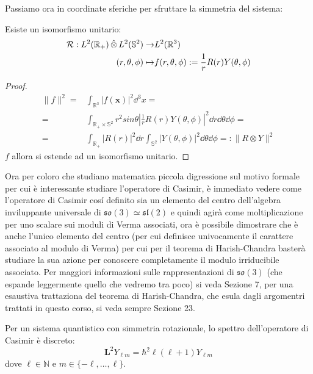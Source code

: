 Passiamo ora in coordinate sferiche per sfruttare la simmetria del sistema:
\begin{lemma}
    Esiste un isomorfismo unitario: 
\begin{align*}
\mathcal{R} :   L^2(\mathbb{R}_+) \operatorname{\hat{\otimes}} L^2(\mathbb{S}^2) \to& L^2(\mathbb{R}^3) \\ 
(r, \theta, \phi) \mapsto& f(r,\theta, \phi) := \dfrac{1}{r}R(r)Y(\theta, \phi)
\end{align*}
\end{lemma}

\begin{proof}
    \begin{align*}
    \|f\|^2=& \int_{\mathbb{R}^3} |f(\mathbf{x})|^2 \dd^3 x = \\
 =& \int_{\mathbb{R}_+ \times \mathbb{S}^2}r^2sin \theta \left| \frac{1}{r}R(r) Y (\theta, \phi)\right|^2 \dd r \dd \theta \dd \phi =\\ 
 =&  \int_{\mathbb{R}_+} |R(r)|^2 \dd r \int_{\mathbb{S}^2} |Y(\theta, \phi)|^2 \dd \theta \dd \phi =: \|R \otimes Y\|^2
    \end{align*}
 $f$ allora si estende ad un isomorfismo unitario. 
\end{proof}


Ora per coloro che studiano matematica piccola digressione sul motivo formale per cui è interessante studiare l'operatore di Casimir, è immediato vedere come l'operatore di Casimir cosí definito sia un elemento del centro dell'algebra inviluppante universale di $\mathfrak{so}(3)\simeq \mathfrak{sl}(2)$ e quindi agirà come moltiplicazione per uno scalare sui moduli di Verma associati, ora è possibile dimostrare che è anche l'unico elemento del centro (per cui definisce univocamente il carattere associato al modulo di Verma) per cui per il teorema di Harish-Chandra basterà studiare la sua azione per conoscere completamente il modulo irriducibile associato. Per maggiori informazioni sulle rappresentazioni di $\mathfrak{so}(3)$ (che espande leggermente quello che vedremo tra poco) si veda \cite{Humphreys} Sezione 7, per una esaustiva trattaziona del teorema di Harish-Chandra, che esula dagli argomentri trattati in questo corso, si veda sempre \cite{Humphreys} Sezione 23. 


Per un sistema quantistico con simmetria rotazionale, lo spettro dell'operatore di Casimir è discreto:
\begin{equation*}
\mathbf{L}^2 Y_{\ell m} = \hbar^2 \ell(\ell+1) Y_{\ell m}
\end{equation*}
dove $\ell \in \mathbb{N}$ e $m \in \{-\ell, \dots, \ell\}$.

